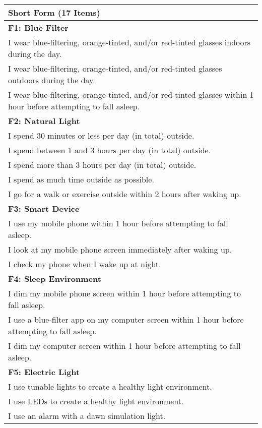 \documentclass[
  english,
  man,floatsintext]{apa6}
\begin{document}
\begin{longtable}[]{@{}
  >{\raggedright\arraybackslash}p{}@{}}
\toprule
Short Form (17 Items) \\
\midrule
\endhead
\textbf{F1: Blue Filter} \\
I wear blue-filtering, orange-tinted, and/or red-tinted glasses indoors during the day. \\
I wear blue-filtering, orange-tinted, and/or red-tinted glasses outdoors during the day. \\
I wear blue-filtering, orange-tinted, and/or red-tinted glasses within 1 hour before attempting to fall asleep. \\
\textbf{F2: Natural Light} \\
I spend 30 minutes or less per day (in total) outside. \\
I spend between 1 and 3 hours per day (in total) outside. \\
I spend more than 3 hours per day (in total) outside. \\
I spend as much time outside as possible. \\
I go for a walk or exercise outside within 2 hours after waking up. \\
\textbf{F3: Smart Device} \\
I use my mobile phone within 1 hour before attempting to fall asleep. \\
I look at my mobile phone screen immediately after waking up. \\
I check my phone when I wake up at night. \\
\textbf{F4: Sleep Environment} \\
I dim my mobile phone screen within 1 hour before attempting to fall asleep. \\
I use a blue-filter app on my computer screen within 1 hour before attempting to fall asleep. \\
I dim my computer screen within 1 hour before attempting to fall asleep. \\
\textbf{F5: Electric Light} \\
I use tunable lights to create a healthy light environment. \\
I use LEDs to create a healthy light environment. \\
I use an alarm with a dawn simulation light. \\
\bottomrule
\end{longtable}
\end{document}
